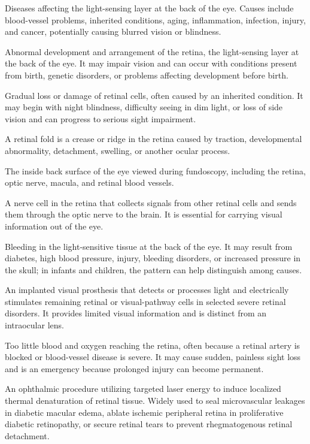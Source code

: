  Diseases affecting the light-sensing layer at the back of the eye. Causes include blood-vessel problems, inherited conditions, aging, inflammation, infection, injury, and cancer, potentially causing blurred vision or blindness.

 Abnormal development and arrangement of the retina, the light-sensing layer at the back of the eye. It may impair vision and can occur with conditions present from birth, genetic disorders, or problems affecting development before birth.

 Gradual loss or damage of retinal cells, often caused by an inherited condition. It may begin with night blindness, difficulty seeing in dim light, or loss of side vision and can progress to serious sight impairment.

 A retinal fold is a crease or ridge in the retina caused by traction, developmental abnormality, detachment, swelling, or another ocular process.

 The inside back surface of the eye viewed during fundoscopy, including the retina, optic nerve, macula, and retinal blood vessels.

 A nerve cell in the retina that collects signals from other retinal cells and sends them through the optic nerve to the brain. It is essential for carrying visual information out of the eye.

 Bleeding in the light-sensitive tissue at the back of the eye. It may result from diabetes, high blood pressure, injury, bleeding disorders, or increased pressure in the skull; in infants and children, the pattern can help distinguish among causes.

 An implanted visual prosthesis that detects or processes light and electrically stimulates remaining retinal or visual-pathway cells in selected severe retinal disorders. It provides limited visual information and is distinct from an intraocular lens.

 Too little blood and oxygen reaching the retina, often because a retinal artery is blocked or blood-vessel disease is severe. It may cause sudden, painless sight loss and is an emergency because prolonged injury can become permanent.

 An ophthalmic procedure utilizing targeted laser energy to induce localized thermal denaturation of retinal tissue. Widely used to seal microvascular leakages in diabetic macular edema, ablate ischemic peripheral retina in proliferative diabetic retinopathy, or secure retinal tears to prevent rhegmatogenous retinal detachment.

